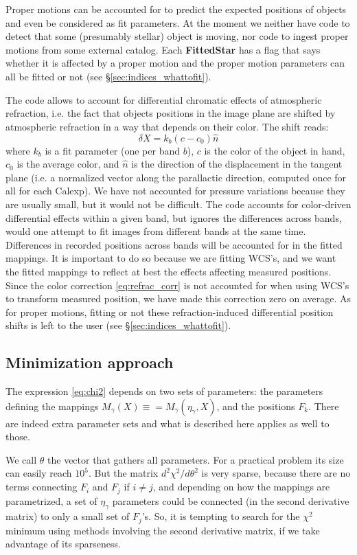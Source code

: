 \documentclass[a4paper,12pt]{scrartcl}
\newcommand{\ClName}[1]{{\bf #1}}
\def\bf{\normalfont\bfseries}
\begin{document}
Proper motions can be accounted for to predict the expected positions
of objects and even be considered as fit parameters. At the moment we
neither have code to detect that some (presumably stellar) object is
moving, nor code to ingest proper motions from some external catalog.
Each \ClName{FittedStar} has a flag that says whether it is affected
by a proper motion and the proper motion parameters can all be fitted
or not (see \S \ref{sec:indices_whattofit}).

The code allows to account for differential chromatic effects of 
atmospheric refraction, i.e. the fact that objects positions in the image
plane are shifted by atmospheric refraction in a way that depends on 
their color. The shift reads:
\begin{equation}
\delta X = k_b(c-c_0)\hat{n} \label{eq:refrac_corr}
\end{equation}
where $k_b$ is a fit parameter (one per band $b$), $c$ is the color of
the object in hand, $c_0$ is the average color, and $\hat{n}$ is the
direction of the displacement in the tangent plane (i.e. a normalized
vector along the parallactic direction, computed once for all for each
Calexp).  We have not accounted for pressure variations because they
are usually small, but it would not be difficult. The code accounts
for color-driven differential effects within a given band, but ignores
the differences across bands, would one attempt to fit images from
different bands at the same time. Differences in recorded positions
across bands will be accounted for in the fitted mappings. It is
important to do so because we are fitting WCS's, and we want the fitted
mappings to reflect at best the effects affecting measured
positions. Since the color correction \ref{eq:refrac_corr} is not
accounted for when using WCS's to transform measured position, we have
made this correction zero on average. As for proper motions, fitting
or not these refraction-induced differential position shifts is left
to the user (see \S \ref{sec:indices_whattofit}).

\subsection{Minimization approach}
The expression \ref{eq:chi2} depends on two sets of parameters: the parameters
defining the mappings $M_\gamma(X) \equiv = M_\gamma(\eta_\gamma,X)$,
and the positions $F_k$. There are indeed extra parameter sets and what 
is described here applies as well to those.

We call $\theta$ the vector that gathers
all parameters. For a practical problem its size
can easily reach $10^5$. But the matrix 
$d^2 \chi^2/d \theta^2$ is very sparse, because
there are no terms connecting $F_i$ and $F_j$ if $i \neq j$, and
depending on how the mappings are parametrized, a set of $\eta_\gamma$
parameters could be connected (in the second derivative matrix) 
to only a small set of $F_j$'s. So, it is tempting to search for the 
$\chi^2$ minimum using methods involving the second derivative matrix, 
if we take advantage of its sparseness.
\end{document}
